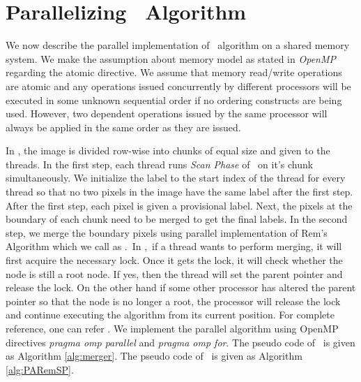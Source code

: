 \vspace{\sectionSpace}
\section{Parallelizing \aremsp\ Algorithm}
\label{sec:parallel_algo}

We now describe the parallel implementation of \aremsp\ algorithm 
on a shared memory system. We make the assumption about memory
model as stated in {\em OpenMP} regarding the atomic directive. We assume that
memory read/write operations are atomic and any operations issued concurrently by different processors will be executed in some unknown sequential order if
no ordering constructs are being used. However, two dependent operations issued
by the same processor will always be applied in the same order as they are
issued.
%


In \paremsp, the image is
divided row-wise into chunks of equal size and given to the threads. In the first step,
each thread runs {\em Scan Phase} of \aremsp\ on it's chunk simultaneously. We
initialize the label to the start index of the thread for every thread so that no 
two pixels in the image have the same label after the first step. After the first step, 
each pixel is given a provisional label. Next, the pixels at the boundary of
each chunk need to be merged to get the final labels. In the second step, we merge the boundary pixels using parallel 
implementation of Rem's Algorithm \cite{Patwary2012_PARemSP} which we call as
\merger.\ In \merger,\ if a thread wants to perform merging, it will first
acquire the necessary lock. Once it gets the lock, it will check whether the
node is still a root node. If yes, then the thread
will set the parent pointer and release the lock. On the other
hand if some other processor has altered the parent pointer so
that the node is no longer a root, the processor will release
the lock and continue executing the algorithm from its current
position. For complete reference, one can refer \cite{Patwary2012_PARemSP}. We
implement the parallel algorithm using OpenMP directives {\em pragma omp parallel} and {\em pragma omp for}. 
The pseudo code of \merger\ is given as Algorithm \ref{alg:merger}. 
The pseudo code of \paremsp\ is given as Algorithm
\ref{alg:PARemSP}.
%
% 
  
